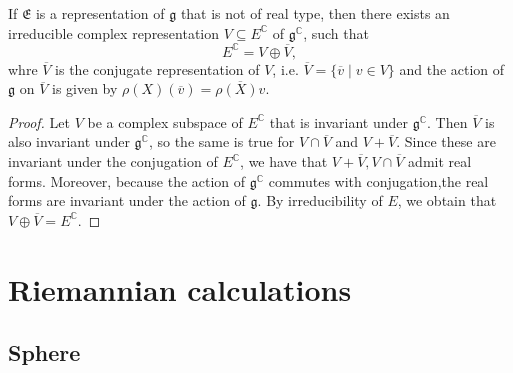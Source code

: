 \documentclass{report}
\begin{document}
\begin{proposition}
    If $\mathfrak E$ is a representation of $\mathfrak g$ that is not of real type, then there exists an irreducible complex representation $V \subseteq E^\mathbb C$ of $\mathfrak g^\mathbb C$, such that
    \[
    E^\mathbb C = V \oplus \overline V,
    \]
    whre $\overline V$ is the conjugate representation of $V$, i.e. $\overline V = \{ \overline v \mid v \in V \}$ and the action of $\mathfrak g$ on $\overline V$ is given by $\rho(X)(\overline v) = \overline{\rho(X)v}$.
\end{proposition}
\begin{proof}
    Let $V$ be a complex subspace of $E^\mathbb C$ that is invariant under $\mathfrak g^\mathbb C$.
    Then $\overline V$ is also invariant under $\mathfrak g^\mathbb C$, so the same is true for $V \cap \overline V$ and $V + \overline V$.
    Since these are invariant under the conjugation of $E^\mathbb C$, we have that $V + \overline V, V \cap \overline V$ admit real forms.
    Moreover, because the action of $\mathfrak g^\mathbb C$ commutes with conjugation,the real forms are invariant under the action of $\mathfrak g$.
    By irreducibility of $E$, we obtain that $V \oplus \overline V = E^\mathbb C$.
\end{proof}
\chapter{Riemannian calculations}
\section{Sphere}
\end{document}

